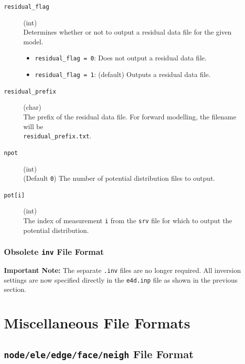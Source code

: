 \documentclass[a4paper,12pt]{article}
\begin{document}
\begin{description}
    \item[\texttt{residual\_flag}] (int)\hfill \\
          Determines whether or not to output a residual data file for the given model.
          \begin{itemize}
              \item \texttt{residual\_flag = 0}: Does not output a residual data file.
              \item \texttt{residual\_flag = 1}: (default) Outputs a residual data file.
          \end{itemize}

    \item[\texttt{residual\_prefix}] (char)\hfill \\
          The prefix of the residual data file. For forward modelling, the filename will be \\
          \texttt{residual\_prefix.txt}.

    \item[\texttt{npot}] (int)\hfill \\
          (Default \texttt{0}) The number of potential distribution files to output.

    \item[\texttt{pot[i]}] (int)\hfill \\
          The index of measurement \texttt{i} from the \texttt{srv} file for which to output the potential distribution.
\end{description}

\newpage
\subsubsection{Obsolete \texttt{inv} File Format} \label{inversion_ip}

\begin{framed}
    \noindent \textbf{Important Note:} The separate \texttt{.inv} files are no longer required. All inversion settings are now specified directly in the \texttt{e4d.inp} file as shown in the previous section.
\end{framed}

\newpage
\section{Miscellaneous File Formats}

\subsection{\texttt{node/ele/edge/face/neigh} File Format} \label{mesh_files}
\end{document}
